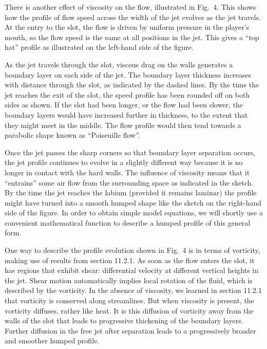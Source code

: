   There is another effect of viscosity on the flow, illustrated in Fig.\ 4. 
  This shows how the profile of flow speed across the width of the jet evolves 
  as the jet travels. At the entry to the slot, the flow is driven by uniform 
  pressure in the player's mouth, so the flow speed is the same at all 
  positions in the jet. This gives a ``top hat'' profile as illustrated on the 
  left-hand side of the figure. 


  As the jet travels through the slot, viscous drag on the walls generates a 
  boundary layer on each side of the jet. The boundary layer thickness 
  increases with distance through the slot, as indicated by the dashed lines. 
  By the time the jet reaches the exit of the slot, the speed profile has been 
  rounded off on both sides as shown. If the slot had been longer, or the flow 
  had been slower, the boundary layers would have increased further in 
  thickness, to the extent that they might meet in the middle. The flow profile 
  would then tend towards a parabolic shape known as ``Poiseuille flow''. 

  Once the jet passes the sharp corners so that boundary layer separation 
  occurs, the jet profile continues to evolve in a slightly different way 
  because it is no longer in contact with the hard walls. The influence of 
  viscosity means that it ``entrains'' some air flow from the surrounding space 
  as indicated in the sketch. By the time the jet reaches the labium (provided 
  it remains laminar) the profile might have turned into a smooth humped shape 
  like the sketch on the right-hand side of the figure. In order to obtain 
  simple model equations, we will shortly use a convenient mathematical 
  function to describe a humped profile of this general form. 

  One way to describe the profile evolution shown in Fig.\ 4 is in terms of 
  vorticity, making use of results from section 11.2.1. As soon as the flow 
  enters the slot, it has regions that exhibit shear: differential velocity at 
  different vertical heights in the jet. Shear motion automatically implies 
  local rotation of the fluid, which is described by the vorticity. In the 
  absence of viscosity, we learned in section 11.2.1 that vorticity is 
  conserved along streamlines. But when viscosity is present, the vorticity 
  diffuses, rather like heat. It is this diffusion of vorticity away from the 
  walls of the slot that leads to progressive thickening of the boundary 
  layers. Further diffusion in the free jet after separation leads to a 
  progressively broader and smoother humped profile. 


